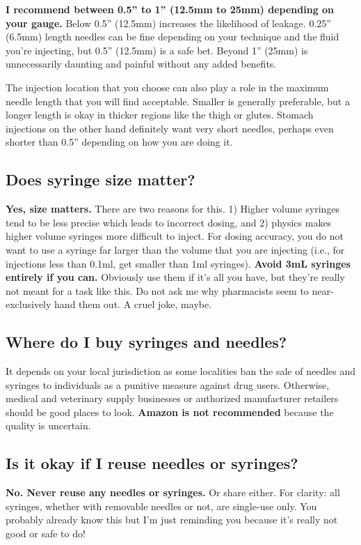\documentclass{article}
\begin{document}
\textbf{I recommend between 0.5” to 1” (12.5mm to 25mm) depending on your gauge.} Below 0.5” (12.5mm) increases the likelihood of leakage. 0.25” (6.5mm) length needles can be fine depending on your technique and the fluid you’re injecting, but 0.5” (12.5mm) is a safe bet. Beyond 1” (25mm) is unnecessarily daunting and painful without any added benefits.

The injection location that you choose can also play a role in the maximum needle length that you will find acceptable. Smaller is generally preferable, but a longer length is okay in thicker regions like the thigh or glutes. Stomach injections on the other hand definitely want very short needles, perhaps even shorter than 0.5” depending on how you are doing it. 

\subsection{Does syringe size matter?}

\textbf{Yes, size matters.} There are two reasons for this. 1) Higher volume syringes tend to be less precise which leads to incorrect dosing, and 2) physics makes higher volume syringes more difficult to inject. For dosing accuracy, you do not want to use a syringe far larger than the volume that you are injecting (i.e., for injections less than 0.1ml, get smaller than 1ml syringes). \textbf{Avoid 3mL syringes entirely if you can.} Obviously use them if it’s all you have, but they’re really not meant for a task like this. Do not ask me why pharmacists seem to near-exclusively hand them out. A cruel joke, maybe.

\subsection{Where do I buy syringes and needles?}

It depends on your local jurisdiction as some localities ban the sale of needles and syringes to individuals as a punitive measure against drug users. Otherwise, medical and veterinary supply businesses or authorized manufacturer retailers should be good places to look. \textbf{Amazon is not recommended} because the quality is uncertain.

\subsection{Is it okay if I reuse needles or syringes?}

\textbf{No. Never reuse any needles or syringes.} Or share either. For clarity: all syringes, whether with removable needles or not, are single-use only. You probably already know this but I’m just reminding you because it’s really not good or safe to do!
\end{document}
